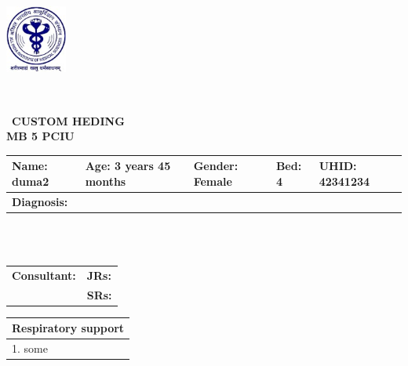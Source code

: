 \documentclass{article}
\begin{document}
\
\noindent
\begin{minipage}{0.2\textwidth} %
    \includegraphics[width=2cm]{RESOURCES/AIIMS_LOGO.png} %
\end{minipage}\
\vspace{-1cm} %
\hfill
\fontsize{9pt}{11pt}\selectfont %
\begin{center}\
    \textbf{CUSTOM HEDING} \\
    \textbf{MB 5 PCIU} \\
\end{center}
\fontsize{10pt}{12pt}\selectfont %
\noindent\begin{tabular}{|p{5cm}|p{4cm}|p{2.5cm}|p{1.5cm}|p{3cm}|}
    \hline
    \textbf{Name:} duma2 & \textbf{Age:} 3 years 45 months & \textbf{Gender:} Female & \textbf{Bed:} 4 & \textbf{UHID:} 42341234 \\
    \hline
    \multicolumn{5}{|p{19cm}|}{\textbf{Diagnosis:}  }\\
    \hline
\end{tabular}
\\
\\
\noindent\begin{tabular}{|p{11.3cm}|p{7.3cm}|}
     \hline
    \textbf{Consultant:}       & \textbf{JRs:}  \\
    \cline{2-2}
      & \textbf{SRs:}  \\
    \hline
\end{tabular}
\vspace{0.1cm} %
\noindent
\begin{minipage}[t]{0.45\textwidth}
\vspace{-2.73cm} %

    

    \begin{tabular}{|p{12cm}|}
        \hline
        \textbf{Respiratory support} \\
        \hline
       1. some \\
        \hline
    \end{tabular}
    \vspace{0.2cm}

\end{minipage}%
\end{document}
